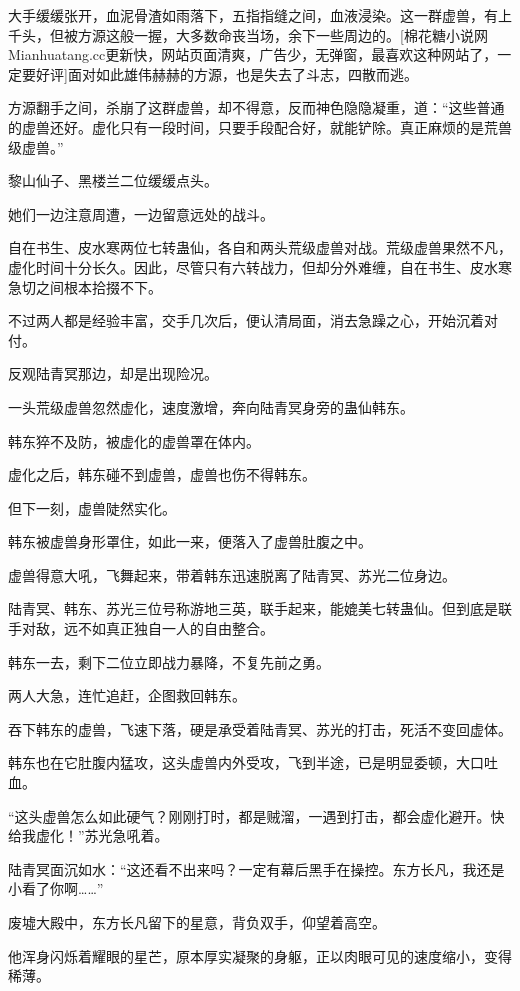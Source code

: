\begin{this_body}
大手缓缓张开，血泥骨渣如雨落下，五指指缝之间，血液浸染。这一群虚兽，有上千头，但被方源这般一握，大多数命丧当场，余下一些周边的。[棉花糖小说网Mianhuatang.cc更新快，网站页面清爽，广告少，无弹窗，最喜欢这种网站了，一定要好评]面对如此雄伟赫赫的方源，也是失去了斗志，四散而逃。

方源翻手之间，杀崩了这群虚兽，却不得意，反而神色隐隐凝重，道：“这些普通的虚兽还好。虚化只有一段时间，只要手段配合好，就能铲除。真正麻烦的是荒兽级虚兽。”

黎山仙子、黑楼兰二位缓缓点头。

她们一边注意周遭，一边留意远处的战斗。

自在书生、皮水寒两位七转蛊仙，各自和两头荒级虚兽对战。荒级虚兽果然不凡，虚化时间十分长久。因此，尽管只有六转战力，但却分外难缠，自在书生、皮水寒急切之间根本拾掇不下。

不过两人都是经验丰富，交手几次后，便认清局面，消去急躁之心，开始沉着对付。

反观陆青冥那边，却是出现险况。

一头荒级虚兽忽然虚化，速度激增，奔向陆青冥身旁的蛊仙韩东。

韩东猝不及防，被虚化的虚兽罩在体内。

虚化之后，韩东碰不到虚兽，虚兽也伤不得韩东。

但下一刻，虚兽陡然实化。

韩东被虚兽身形罩住，如此一来，便落入了虚兽肚腹之中。

虚兽得意大吼，飞舞起来，带着韩东迅速脱离了陆青冥、苏光二位身边。

陆青冥、韩东、苏光三位号称游地三英，联手起来，能媲美七转蛊仙。但到底是联手对敌，远不如真正独自一人的自由整合。

韩东一去，剩下二位立即战力暴降，不复先前之勇。

两人大急，连忙追赶，企图救回韩东。

吞下韩东的虚兽，飞速下落，硬是承受着陆青冥、苏光的打击，死活不变回虚体。

韩东也在它肚腹内猛攻，这头虚兽内外受攻，飞到半途，已是明显委顿，大口吐血。

“这头虚兽怎么如此硬气？刚刚打时，都是贼溜，一遇到打击，都会虚化避开。快给我虚化！”苏光急吼着。

陆青冥面沉如水：“这还看不出来吗？一定有幕后黑手在操控。东方长凡，我还是小看了你啊……”

废墟大殿中，东方长凡留下的星意，背负双手，仰望着高空。

他浑身闪烁着耀眼的星芒，原本厚实凝聚的身躯，正以肉眼可见的速度缩小，变得稀薄。


\end{this_body}
